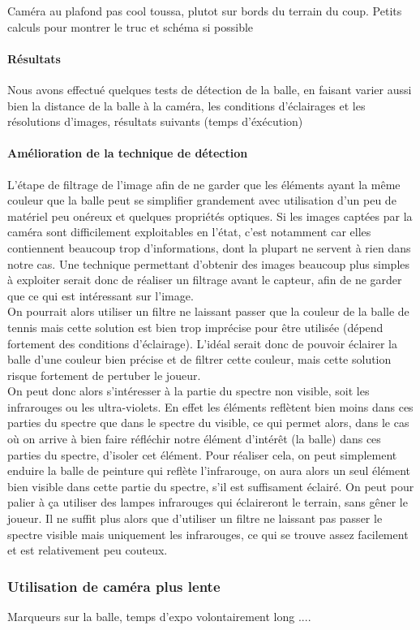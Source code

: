 Caméra au plafond pas cool toussa, plutot sur bords du terrain du coup. Petits calculs pour montrer le truc et schéma si possible


\paragraph{Résultats\\}

Nous avons effectué quelques tests de détection de la balle, en faisant varier aussi bien la distance de la balle à la caméra, les conditions d'éclairages et les résolutions d'images, résultats suivants (temps d'éxécution)


\paragraph{Amélioration de la technique de détection\\}

L'étape de filtrage de l'image afin de ne garder que les éléments ayant la même couleur que la balle peut se simplifier grandement avec utilisation d'un peu de matériel peu onéreux et quelques propriétés optiques. Si les images captées par la caméra sont difficilement exploitables en l'état, c'est notamment car elles contiennent beaucoup trop d'informations, dont la plupart ne servent à rien dans notre cas. Une technique permettant d'obtenir des images beaucoup plus simples à exploiter serait donc de réaliser un filtrage avant le capteur, afin de ne garder que ce qui est intéressant sur l'image. \\

On pourrait alors utiliser un filtre ne laissant passer que la couleur de la balle de tennis mais cette solution est bien trop imprécise pour être utilisée (dépend fortement des conditions d'éclairage). L'idéal serait donc de pouvoir éclairer la balle d'une couleur bien précise et de filtrer cette couleur, mais cette solution risque fortement de pertuber le joueur. \\

On peut donc alors s'intéresser à la partie du spectre non visible, soit les infrarouges ou les ultra-violets. En effet les éléments reflètent bien moins dans ces parties du spectre que dans le spectre du visible, ce qui permet alors, dans le cas où on arrive à bien faire réfléchir notre élément d'intérêt (la balle) dans ces parties du spectre, d'isoler cet élément. Pour réaliser cela, on peut simplement enduire la balle de peinture qui reflète l'infrarouge, on aura alors un seul élément bien visible dans cette partie du spectre, s'il est suffisament éclairé. On peut pour palier à ça utiliser des lampes infrarouges qui éclaireront le terrain, sans gêner le joueur. Il ne suffit plus alors que d'utiliser un filtre ne laissant pas passer le spectre visible mais uniquement les infrarouges, ce qui se trouve assez facilement et est relativement peu couteux.


\subsubsection{Utilisation de caméra plus lente}

Marqueurs sur la balle, temps d'expo volontairement long .... 

